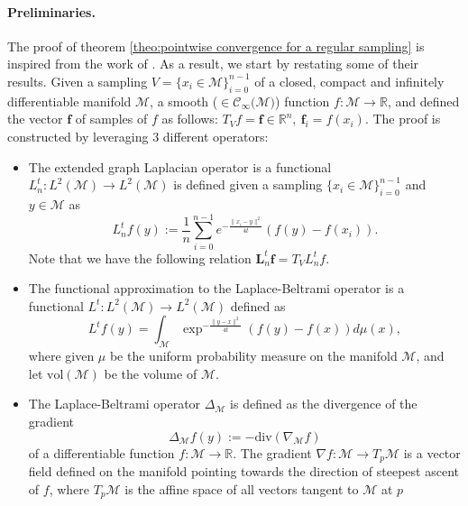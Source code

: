 \documentclass{article} %
\renewcommand{\b}[1]{{\bm{#1}}}   %
\begin{document}
\paragraph{Preliminaries.}
The proof of theorem \ref{theo:pointwise convergence for a regular sampling} is inspired from the work of \cite{belkin2005towards}. As a result, we start by restating some of their results.
Given a sampling $V = \{x_i\in\mathcal M\}_{i=0}^{n-1}$ of a closed, compact and infinitely differentiable manifold $\mathcal{M}$, a smooth ($\in\mathcal{C}_\infty(\mathcal{M)}$) function  $f:\mathcal{M} \rightarrow \mathbb{R}$, and defined the vector $\b{f}$ of samples of $f$ as follows: $T_Vf=\b{f} \in \mathbb{R}^n,\ \b{f}_i = f(x_i)$.
The proof is constructed by leveraging 3 different operators:
\begin{itemize}
    \item The extended graph Laplacian operator is a functional $L_n^t: L^{2}(\mathcal{M}) \rightarrow L^{2}(\mathcal{M})$  is defined given a sampling $\{x_i\in\mathcal M\}_{i=0}^{n-1}$ and $y\in \mathcal{M}$  as
	\begin{equation}
	\label{eq:Heat Kernel Graph Laplacian operator}
	 L_n^tf(y) := \frac{1}{n}\sum_{i=0}^{n-1} e^{ -\frac{\|x_i-y\|^2}{4t}} \left(f(y)-f(x_i)\right).
	\end{equation}
	Note that we have the following relation $\b{L}_n^t \b{f} = T_V L_n^t f$.
	\item The functional approximation to the Laplace-Beltrami operator is a functional $L^t: L^{2}(\mathcal{M}) \rightarrow L^{2}(\mathcal{M})$ defined  as
	\begin{equation}
    \label{eq:Functional approximation to the Laplace-Beltrami operator}
	L^tf(y) = \int_{\mathcal{M}} \exp^{-\frac{\|y-x\|^2}{4t}}\left(f(y)-f(x)\right)d\mu(x),
	\end{equation}
	where given $\mu$ be the uniform probability measure on the manifold $\mathcal{M}$, and let $\text{vol}(\mathcal{M})$ be the volume of $\mathcal{M}$.
	\item 
	The Laplace-Beltrami operator $\Delta_{\mathcal{M}}$ is defined as the divergence of the gradient
	\begin{equation}
        \label{eq:laplace-beltrami}
        \Delta_{\mathcal M}f(y):= -\text{div}(\nabla_{\mathcal M}f)
    \end{equation}
    of a differentiable function $f: \mathcal M\rightarrow \mathbb R$. The gradient $\nabla f: \mathcal M \rightarrow T_p\mathcal M$ is a vector field defined on the manifold pointing towards the direction of steepest ascent of $f$, where $T_p\mathcal M$ is the affine space of all vectors tangent to $\mathcal M$ at $p$
    
\end{itemize}
\end{document}

